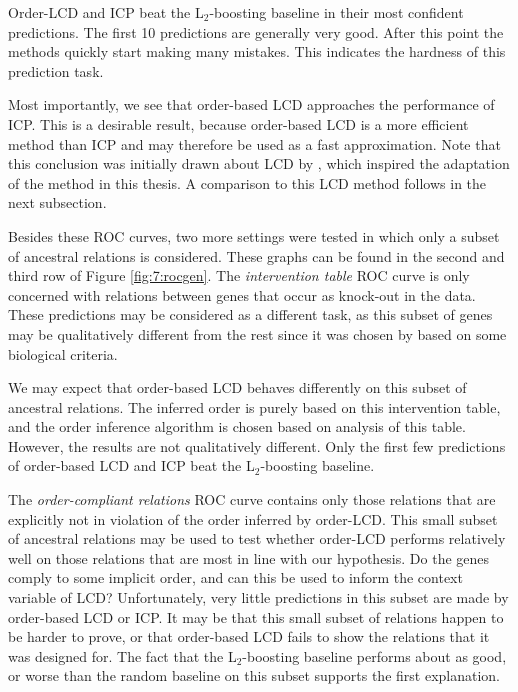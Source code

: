 Order-LCD and ICP beat the L$_2$-boosting baseline in their most confident predictions. The first 10 predictions are generally very good. After this point the methods quickly start making many mistakes. This indicates the hardness of this prediction task.

Most importantly, we see that order-based LCD approaches the performance of ICP. This is a desirable result, because order-based LCD is a more efficient method than ICP and may therefore be used as a fast approximation. Note that this conclusion was initially drawn about LCD by \citet{versteeg2019boosting}, which inspired the adaptation of the method in this thesis. A comparison to this LCD method follows in the next subsection.

Besides these ROC curves, two more settings were tested in which only a subset of ancestral relations is considered. These graphs can be found in the second and third row of Figure \ref{fig:7:rocgen}. The \textit{intervention table} ROC curve is only concerned with relations between genes that occur as knock-out in the data. These predictions may be considered as a different task, as this subset of genes may be qualitatively different from the rest since it was chosen by \citet{kemmeren2014large} based on some biological criteria. 

We may expect that order-based LCD behaves differently on this subset of ancestral relations. The inferred order is purely based on this intervention table, and the order inference algorithm is chosen based on analysis of this table. However, the results are not qualitatively different. Only the first few predictions of order-based LCD and ICP beat the L$_2$-boosting baseline.

The \textit{order-compliant relations} ROC curve contains only those relations that are explicitly not in violation of the order inferred by order-LCD. This small subset of ancestral relations may be used to test whether order-LCD performs relatively well on those relations that are most in line with our hypothesis. Do the genes comply to some implicit order, and can this be used to inform the context variable of LCD? Unfortunately, very little predictions in this subset are made by order-based LCD or ICP. It may be that this small subset of relations happen to be harder to prove, or that order-based LCD fails to show the relations that it was designed for. The fact that the L$_2$-boosting baseline performs about as good, or worse than the random baseline on this subset supports the first explanation.



